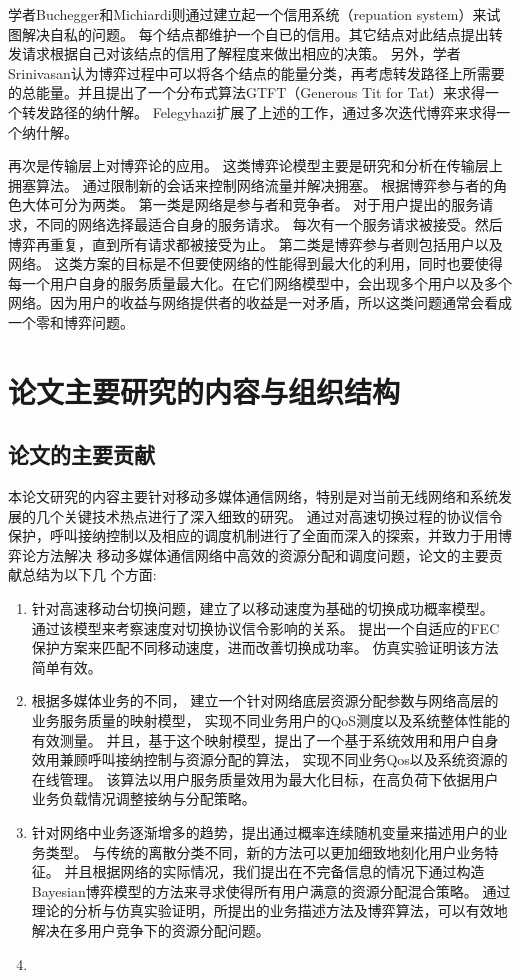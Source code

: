 学者Buchegger和Michiardi则通过建立起一个信用系统（repuation system）来试图解决自私的问题\cite{Buchegger_Boudec_2002}\cite{Michiardi_Molva_2002}。
每个结点都维护一个自已的信用。其它结点对此结点提出转发请求根据自己对该结点的信用了解程度来做出相应的决策。
另外，学者Srinivasan认为博弈过程中可以将各个结点的能量分类，再考虑转发路径上所需要的总能量。并且提出了一个分布式算法GTFT（Generous Tit for Tat）来求得一个转发路径的纳什解\cite{Srinivasan2003}。
Felegyhazi扩展了上述的工作，通过多次迭代博弈来求得一个纳什解\cite{FelegyhaziHubaux2006}。

再次是传输层上对博弈论的应用。
这类博弈论模型主要是研究和分析在传输层上拥塞算法。
通过限制新的会话来控制网络流量并解决拥塞。
根据博弈参与者的角色大体可分为两类。
第一类是网络是参与者和竞争者。
对于用户提出的服务请求，不同的网络选择最适合自身的服务请求\cite{Charilas2009}。
每次有一个服务请求被接受。然后博弈再重复，直到所有请求都被接受为止。
第二类是博弈参与者则包括用户以及网络。
这类方案的目标是不但要使网络的性能得到最大化的利用，同时也要使得每一个用户自身的服务质量最大化。在它们网络模型中，会出现多个用户以及多个网络。因为用户的收益与网络提供者的收益是一对矛盾，所以这类问题通常会看成一个零和博弈问题\cite{LinChatterjee2005}\cite{VlacheasCharilas2008}。

\section{论文主要研究的内容与组织结构}
\subsection{论文的主要贡献}
本论文研究的内容主要针对移动多媒体通信网络，特别是对当前无线网络和系统发展的几个关键技术热点进行了深入细致的研究。
通过对高速切换过程的协议信令保护，呼叫接纳控制以及相应的调度机制进行了全面而深入的探索，并致力于用博弈论方法解决
移动多媒体通信网络中高效的资源分配和调度问题，论文的主要贡献总结为以下几
个方面:
\begin{enumerate}[(1.)]
\item 
针对高速移动台切换问题，建立了以移动速度为基础的切换成功概率模型。
通过该模型来考察速度对切换协议信令影响的关系。
提出一个自适应的FEC保护方案来匹配不同移动速度，进而改善切换成功率。
仿真实验证明该方法简单有效。

\item 
根据多媒体业务的不同，
建立一个针对网络底层资源分配参数与网络高层的业务服务质量的映射模型，
实现不同业务用户的QoS测度以及系统整体性能的有效测量。
并且，基于这个映射模型，提出了一个基于系统效用和用户自身效用兼顾呼叫接纳控制与资源分配的算法，
实现不同业务Qos以及系统资源的在线管理。
该算法以用户服务质量效用为最大化目标，在高负荷下依据用户业务负载情况调整接纳与分配策略。

\item 
针对网络中业务逐渐增多的趋势，提出通过概率连续随机变量来描述用户的业务类型。
与传统的离散分类不同，新的方法可以更加细致地刻化用户业务特征。
并且根据网络的实际情况，我们提出在不完备信息的情况下通过构造Bayesian博弈模型的方法来寻求使得所有用户满意的资源分配混合策略。
通过理论的分析与仿真实验证明，所提出的业务描述方法及博弈算法，可以有效地解决在多用户竞争下的资源分配问题。
\item 

\end{enumerate}

